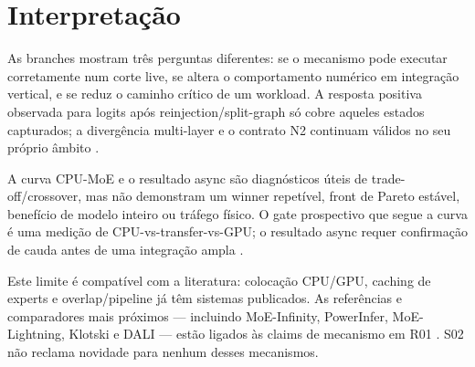 \section{Interpretação}
As branches mostram três perguntas diferentes: se o mecanismo pode executar corretamente num corte live, se altera o comportamento numérico em integração vertical, e se reduz o caminho crítico de um workload. A resposta positiva observada para logits após reinjection/split-graph só cobre aqueles estados capturados; a divergência multi-layer e o contrato N2 continuam válidos no seu próprio âmbito    .

A curva CPU-MoE e o resultado async são diagnósticos úteis de trade-off/crossover, mas não demonstram um winner repetível, front de Pareto estável, benefício de modelo inteiro ou tráfego físico. O gate prospectivo que segue a curva é uma medição de CPU-vs-transfer-vs-GPU; o resultado async requer confirmação de cauda antes de uma integração ampla   .

Este limite é compatível com a literatura: colocação CPU/GPU, caching de experts e overlap/pipeline já têm sistemas publicados. As referências e comparadores mais próximos — incluindo MoE-Infinity, PowerInfer, MoE-Lightning, Klotski e DALI — estão ligados às claims de mecanismo em R01 \cite{xue2024moeinfinity,song2024powerinfer,cao2025moelightning,fang2025klotski,zhu2026dali}. S02 não reclama novidade para nenhum desses mecanismos.
